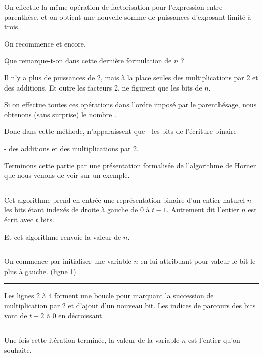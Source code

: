 \change
On effectue la même opération de factorisation pour l'expression entre parenthèse, et on obtient une nouvelle somme de puissances d'exposant limité à trois.

\change
On recommence
\change
et encore.

Que remarque-t-on dans cette dernière formulation de $n$ ?

Il n'y a plus de puissances de 2, mais à la place seules des multiplications par 2 et des additions. Et outre les facteurs 2, ne figurent que les bits de $n$.

Si on effectue toutes ces opérations dans l'ordre imposé par le parenthésage, nous obtenons (sans surprise) le nombre
.

\change
Donc dans cette méthode, n'apparaissent que
\change
- les bits de l'écriture binaire

\change
- des additions et des multiplications par 2.

\diapo %

Terminons cette partie par une présentation formalisée de l'algorithme de Horner que nous venons de voir sur un exemple.

\hrule\medskip

Cet algorithme prend en entrée une représentation binaire d'un entier naturel $n$ les bits étant indexés de droite à gauche de $0$ à $t-1$. Autrement dit l'entier $n$ est écrit avec $t$ bits.

Et cet algorithme renvoie la valeur de $n$.

\hrule\medskip

On commence par initialiser une variable $n$ en lui attribuant pour valeur le bit le plus à gauche. (ligne 1)

\hrule\medskip
Les lignes 2 à 4 forment une boucle pour marquant la succession de multiplication par 2 et d'ajout d'un nouveau bit.
Les indices de parcours des bits vont de $t-2$ à $0$ en décroissant.

\hrule\medskip

Une fois cette itération terminée, la valeur de la variable $n$ est l'entier qu'on souhaite.





